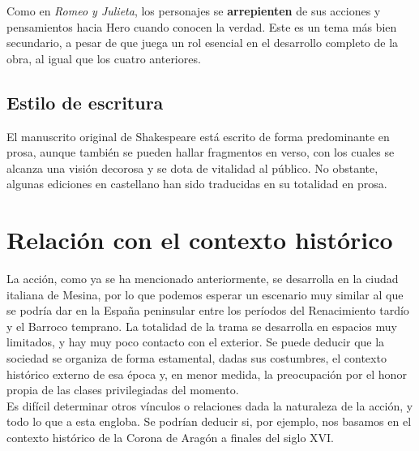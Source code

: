 \documentclass[12pt,a4paper]{article}
\begin{document}
Como en \textit{Romeo y Julieta}, los personajes se \textbf{arrepienten} de sus acciones y pensamientos hacia Hero cuando conocen la verdad. Este es un tema más bien secundario, a pesar de que juega un rol esencial en el desarrollo completo de la obra, al igual que los cuatro anteriores.

\subsection{Estilo de escritura}

El manuscrito original de Shakespeare está escrito de forma predominante en prosa, aunque también se pueden hallar fragmentos en verso, con los cuales se alcanza una visión decorosa y se dota de vitalidad al público. No obstante, algunas ediciones en castellano han sido traducidas en su totalidad en prosa.

\section{Relación con el contexto histórico}

La acción, como ya se ha mencionado anteriormente, se desarrolla en la ciudad italiana de Mesina, por lo que podemos esperar un escenario muy similar al que se podría dar en la España peninsular entre los períodos del Renacimiento tardío y el Barroco temprano. La totalidad de la trama se desarrolla en espacios muy limitados, y hay muy poco contacto con el exterior. Se puede deducir que la sociedad se organiza de forma estamental, dadas sus costumbres, el contexto histórico externo de esa época y, en menor medida, la preocupación por el honor propia de las clases privilegiadas del momento.\\

Es difícil determinar otros vínculos o relaciones dada la naturaleza de la acción, y todo lo que a esta engloba. Se podrían deducir si, por ejemplo, nos basamos en el contexto histórico de la Corona de Aragón a finales del siglo XVI.
\end{document}
